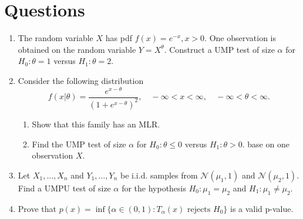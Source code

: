 \documentclass[12pt]{extarticle}
\begin{document}
\section{Questions}
 
\begin{enumerate}
    \item The random variable $X$ has pdf $f(x)=e^{-x}, x>0$. One observation is obtained on the random variable $Y=X^\theta$. Construct a UMP test of size $\alpha$ for $H_0: \theta=1$ versus $H_1: \theta=2$.
	
	\vspace{4cm}
	\item Consider the following distribution
$$f(x|\theta) = \frac{e^{x-\theta}}{(1+e^{x-\theta})^2},\quad -\infty<x<\infty, \quad -\infty < \theta<\infty.$$
\begin{enumerate}
	\item Show that this family has an MLR.
	\item Find the UMP test of size $\alpha$ for $H_0: \theta\leq 0$ versus $H_1: \theta >0$.  base on one observation $X$. 

\end{enumerate}
	\vspace{4cm}
	\item Let $X_1,\ldots, X_n$ and $Y_1,\ldots, Y_n$ be i.i.d. samples from $\mathcal N(\mu_1, 1)$ and $\mathcal N(\mu_2, 1)$. Find a UMPU test of size $\alpha$ for the hypothesis $H_0: \mu_1 = \mu_2$ and $H_1: \mu_1 \neq \mu_2$.
	\vspace{4cm}
	\item Prove that $p(x) = \inf \{\alpha\in (0, 1): T_\alpha(x) \text{ rejects } H_0\}$ is a valid p-value.
\end{enumerate}
\end{document}
